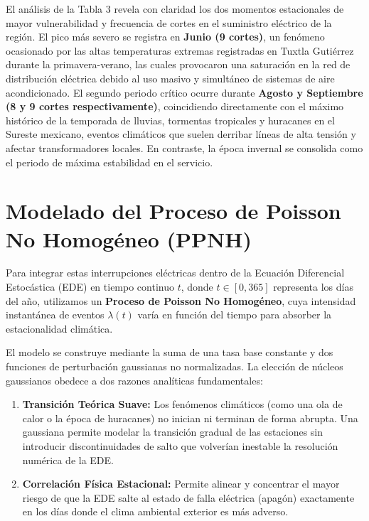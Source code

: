 \documentclass[
  spanish,
  letterpaper,
  DIV=11,
  numbers=noendperiod]{scrreprt}
\providecommand{\tightlist}{%
  \setlength{\itemsep}{0pt}\setlength{\parskip}{0pt}}
\theoremstyle{plain}
\theoremstyle{definition}
\theoremstyle{remark}
\begin{document}
El análisis de la Tabla 3 revela con claridad los dos momentos
estacionales de mayor vulnerabilidad y frecuencia de cortes en el
suministro eléctrico de la región. El pico más severo se registra en
\textbf{Junio (9 cortes)}, un fenómeno ocasionado por las altas
temperaturas extremas registradas en Tuxtla Gutiérrez durante la
primavera-verano, las cuales provocaron una saturación en la red de
distribución eléctrica debido al uso masivo y simultáneo de sistemas de
aire acondicionado. El segundo periodo crítico ocurre durante
\textbf{Agosto y Septiembre (8 y 9 cortes respectivamente)},
coincidiendo directamente con el máximo histórico de la temporada de
lluvias, tormentas tropicales y huracanes en el Sureste mexicano,
eventos climáticos que suelen derribar líneas de alta tensión y afectar
transformadores locales. En contraste, la época invernal se consolida
como el periodo de máxima estabilidad en el servicio.

\section{Modelado del Proceso de Poisson No Homogéneo
(PPNH)}\label{sec-ppnh}

Para integrar estas interrupciones eléctricas dentro de la Ecuación
Diferencial Estocástica (EDE) en tiempo continuo \(t\), donde
\(t \in [0, 365]\) representa los días del año, utilizamos un
\textbf{Proceso de Poisson No Homogéneo}, cuya intensidad instantánea de
eventos \(\lambda(t)\) varía en función del tiempo para absorber la
estacionalidad climática.

El modelo se construye mediante la suma de una tasa base constante y dos
funciones de perturbación gaussianas no normalizadas. La elección de
núcleos gaussianos obedece a dos razones analíticas fundamentales:

\begin{enumerate}
\def\labelenumi{\arabic{enumi}.}
\tightlist
\item
  \textbf{Transición Teórica Suave:} Los fenómenos climáticos (como una
  ola de calor o la época de huracanes) no inician ni terminan de forma
  abrupta. Una gaussiana permite modelar la transición gradual de las
  estaciones sin introducir discontinuidades de salto que volverían
  inestable la resolución numérica de la EDE.
\item
  \textbf{Correlación Física Estacional:} Permite alinear y concentrar
  el mayor riesgo de que la EDE salte al estado de falla eléctrica
  (apagón) exactamente en los días donde el clima ambiental exterior es
  más adverso.
\end{enumerate}
\end{document}
